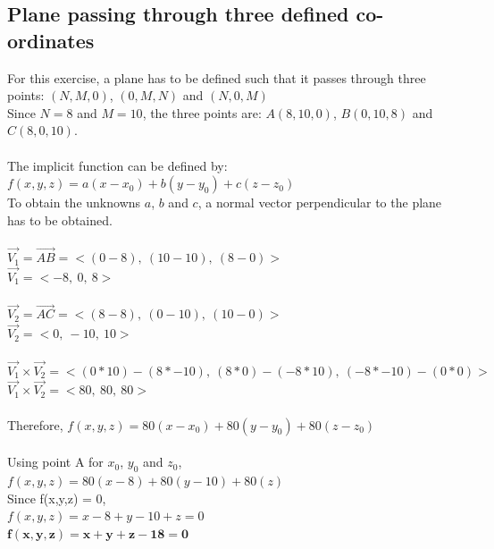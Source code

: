 \documentclass[acmlarge,nonacm=true]{acmart}
\begin{document}
\subsection{Plane passing through three defined co-ordinates}
For this exercise, a plane has to be defined such that it passes through three points: 
$(N,M,0)$, $(0,M,N)$ and $(N,0,M)$\\
Since \(N = 8\) and \(M = 10\), the three points are: $A(8,10,0)$, $B(0,10,8)$ and $C(8,0,10)$.\\\\
The implicit function can be defined by: $f(x,y,z) = a(x-x_0) + b(y-y_0) + c(z-z_0)$\\
To obtain the unknowns $a$, $b$ and $c$, a normal vector perpendicular to the plane has to be obtained.\\\\
$\vec{V_1} = \vec{AB} = <(0-8),\ (10-10),\ (8-0)>$\\
$\vec{V_1} = <-8,\ 0,\ 8>$\\\\
$\vec{V_2} = \vec{AC} = <(8-8),\ (0-10),\ (10-0)>$\\
$\vec{V_2} = <0,\ -10,\ 10>$\\\\
$\vec{V_1}\times\vec{V_2} = <(0*10)-(8*-10),\ (8*0)-(-8*10),\ (-8*-10)-(0*0)>$\\
$\vec{V_1}\times\vec{V_2} = <80,\ 80,\ 80>$\\\\
Therefore, $f(x,y,z) = 80(x-x_0) + 80(y-y_0) + 80(z-z_0)$\\\\
Using point A for $x_0$, $y_0$ and $z_0$,\\
$f(x,y,z) = 80(x-8) + 80(y-10) + 80(z)$\\
Since f(x,y,z) = 0,\\
$f(x,y,z) = x-8 + y-10 + z = 0$\\
$\mathbf{f(x,y,z) = x + y + z -18 = 0}$\\\\
\end{document}
